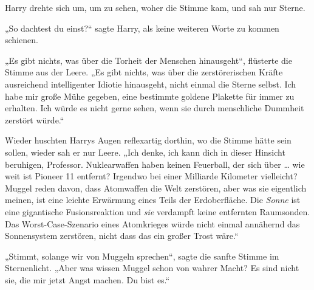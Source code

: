 Harry drehte sich um, um zu sehen, woher die Stimme kam, und sah nur Sterne.

„So dachtest du einst?“ sagte Harry, als keine weiteren Worte zu kommen schienen.

„Es gibt nichts, was über die Torheit der Menschen hinausgeht“, flüsterte die Stimme aus der Leere.
„Es gibt nichts, was über die zerstörerischen Kräfte ausreichend intelligenter Idiotie hinausgeht, nicht einmal die Sterne selbst. Ich habe mir große Mühe gegeben, eine bestimmte goldene Plakette für immer zu erhalten. Ich würde es nicht gerne sehen, wenn sie durch menschliche Dummheit zerstört würde.“

Wieder huschten Harrys Augen reflexartig dorthin, wo die Stimme hätte sein sollen, wieder sah er nur Leere.
„Ich denke, ich kann dich in dieser Hinsicht beruhigen, Professor. Nuklearwaffen haben keinen Feuerball, der sich über … wie weit ist Pioneer 11 entfernt? Irgendwo bei einer Milliarde Kilometer vielleicht? Muggel reden davon, dass Atomwaffen die Welt zerstören, aber was sie eigentlich meinen, ist eine leichte Erwärmung eines Teils der Erdoberfläche. Die \emph{Sonne} ist eine gigantische Fusionsreaktion und \emph{sie} verdampft keine entfernten Raumsonden. Das Worst-Case-Szenario eines Atomkrieges würde nicht einmal annähernd das Sonnensystem zerstören, nicht dass das ein großer Trost wäre.“

„Stimmt, solange wir von Muggeln sprechen“, sagte die sanfte Stimme im Sternenlicht.
„Aber was wissen Muggel schon von wahrer Macht? Es sind nicht sie, die mir jetzt Angst machen. Du bist es.“

